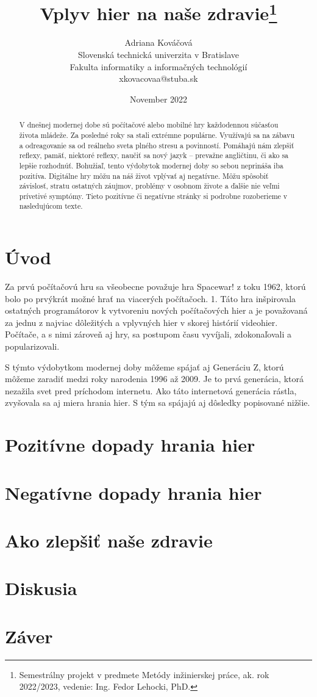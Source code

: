 \documentclass[10pt,twoside,slovak,a4paper]{article}
\title{Vplyv hier na naše zdravie\thanks{Semestrálny projekt v predmete Metódy inžinierskej práce, ak. rok 2022/2023, vedenie: Ing. Fedor Lehocki, PhD.}}
\author{Adriana Kováčová\\
	{\small Slovenská technická univerzita v Bratislave}\\
	{\small Fakulta informatiky a informačných technológií}\\
	{\small {xkovacovaa@stuba.sk}}
	}
\date{November 2022}
\begin{document}
\maketitle


\begin{abstract}
V dnešnej modernej dobe sú počítačové alebo mobilné hry každodennou súčasťou života mládeže. Za posledné roky sa stali extrémne populárne. Využívajú sa na zábavu a odreagovanie sa od reálneho sveta plného stresu a povinností. Pomáhajú nám zlepšiť reflexy, pamäť, niektoré reflexy, naučiť sa nový jazyk – prevažne angličtinu, či ako sa lepšie rozhodnúť. Bohužiaľ, tento výdobytok modernej doby so sebou neprináša iba pozitíva.
Digitálne hry môžu na náš život vplývať aj negatívne. Môžu spôsobiť závislosť, stratu ostatných záujmov, problémy v osobnom živote a ďalšie nie veľmi prívetivé symptómy. Tieto pozitívne či negatívne stránky si podrobne rozoberieme v nasledujúcom texte.
\end{abstract}

\section{Úvod}

Za prvú počítačovú hru sa všeobecne považuje hra Spacewar! z toku 1962, ktorú bolo po prvýkrát možné hrať na viacerých počítačoch. 1. Táto hra inšpirovala ostatných programátorov k vytvoreniu nových počítačových hier a je považovaná za jednu z najviac dôležitých a vplyvných hier v skorej histórií videohier. Počítače, a s nimi zároveň aj hry, sa postupom času vyvíjali, zdokonaľovali a popularizovali. 

S týmto výdobytkom modernej doby môžeme spájať aj Generáciu Z, ktorú môžeme zaradiť medzi roky narodenia 1996 až 2009. Je to prvá generácia, ktorá nezažila svet pred príchodom internetu. Ako táto internetová generácia rástla, zvyšovala sa aj miera hrania hier. S tým sa spájajú aj dôsledky popisované nižšie.


\section{Pozitívne dopady hrania hier}


\section{Negatívne dopady hrania hier}


\section{Ako zlepšiť naše zdravie}


\section{Diskusia}


\section{Záver}





\end{document}
